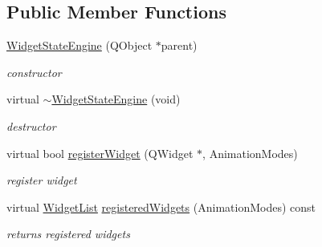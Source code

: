 \subsection*{Public Member Functions}
\begin{DoxyCompactItemize}
\item 
\mbox{\label{class_widget_state_engine_a27eee2c759d82970d5eceeb2ded4ee76}} 
\hyperlink{class_widget_state_engine_a27eee2c759d82970d5eceeb2ded4ee76}{Widget\+State\+Engine} (Q\+Object $\ast$parent)
\begin{DoxyCompactList}\small\item\em constructor \end{DoxyCompactList}\item 
\mbox{\label{class_widget_state_engine_add6425ca299770bb7d9118fabb3d2e44}} 
virtual \hyperlink{class_widget_state_engine_add6425ca299770bb7d9118fabb3d2e44}{$\sim$\+Widget\+State\+Engine} (void)
\begin{DoxyCompactList}\small\item\em destructor \end{DoxyCompactList}\item 
\mbox{\label{class_widget_state_engine_a1cb5f31f799d8600020b000913429327}} 
virtual bool \hyperlink{class_widget_state_engine_a1cb5f31f799d8600020b000913429327}{register\+Widget} (Q\+Widget $\ast$, Animation\+Modes)
\begin{DoxyCompactList}\small\item\em register widget \end{DoxyCompactList}\item 
\mbox{\label{class_widget_state_engine_abca23a59d91d9d83b508bf8dfa7aa449}} 
virtual \hyperlink{class_base_engine_a2b0faec98a7eb68c91b502459c46a9c7}{Widget\+List} \hyperlink{class_widget_state_engine_abca23a59d91d9d83b508bf8dfa7aa449}{registered\+Widgets} (Animation\+Modes) const
\begin{DoxyCompactList}\small\item\em returns registered widgets \end{DoxyCompactList}\item 
\mbox{\label{class_widget_state_engine_a49fadff0e6704e5b151bf99beb6451d0}} 

\end{DoxyCompactItemize}

